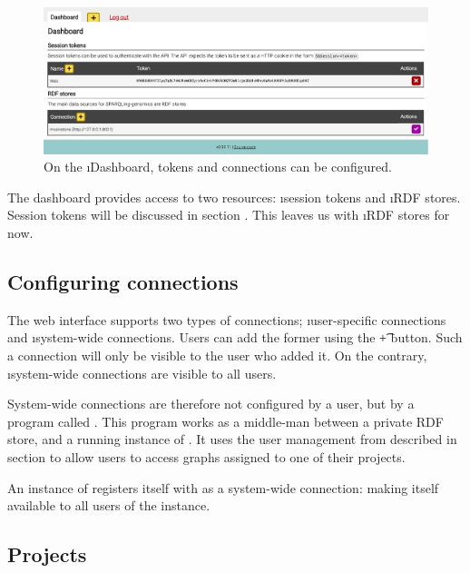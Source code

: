   \begin{figure}[H]
    \begin{center}
      \includegraphics[width=1.0\textwidth]{figures/sg-web-dashboard.pdf}
    \end{center}
    \caption{On the \i{Dashboard}, tokens and connections can be
      configured.}
    \label{fig:web-dashboard}
  \end{figure}

  The dashboard provides access to two resources: \i{session tokens}
  and \i{RDF stores}.  Session tokens will be discussed in section
  .  This leaves us with \i{RDF stores} for now.

\subsection{Configuring connections}
\label{sec:configure-connections}

  The web interface supports two types of connections; \i{user-specific
    connections} and \i{system-wide connections}.  Users can add the
  former using the \t{+} button.  Such a connection will only be visible
  to the user who added it.  On the contrary, \i{system-wide connections}
  are visible to all users.

  System-wide connections are therefore not configured by a user, but by a
  program called .  This program works as a middle-man
  between a private RDF store, and a running instance of .  It
  uses the user management from  described in section
   to allow users to access graphs assigned to one
  of their projects.

  An instance of  registers itself with
   as a system-wide connection: making itself available to
  all users of the  instance.

\subsection{Projects}
\label{sec:web-projects}

